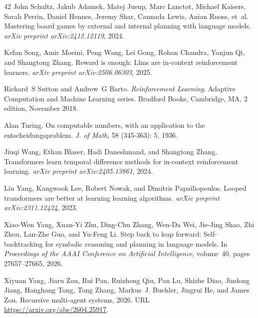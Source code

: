 \begin{thebibliography}{42}
John Schultz, Jakub Adamek, Matej Jusup, Marc Lanctot, Michael Kaisers, Sarah Perrin, Daniel Hennes, Jeremy Shar, Cannada Lewis, Anian Ruoss, et~al.
\newblock Mastering board games by external and internal planning with language models.
\newblock \emph{arXiv preprint arXiv:2412.12119}, 2024.

Kefan Song, Amir Moeini, Peng Wang, Lei Gong, Rohan Chandra, Yanjun Qi, and Shangtong Zhang.
\newblock Reward is enough: Llms are in-context reinforcement learners.
\newblock \emph{arXiv preprint arXiv:2506.06303}, 2025.

Richard~S Sutton and Andrew~G Barto.
\newblock \emph{Reinforcement Learning}.
\newblock Adaptive Computation and Machine Learning series. Bradford Books, Cambridge, MA, 2 edition, November 2018.

Alan Turing.
\newblock On computable numbers, with an application to the entscheidungsproblem.
\newblock \emph{J. of Math}, 58 (345-363): 5, 1936.

Jiuqi Wang, Ethan Blaser, Hadi Daneshmand, and Shangtong Zhang.
\newblock Transformers learn temporal difference methods for in-context reinforcement learning.
\newblock \emph{arXiv preprint arXiv:2405.13861}, 2024.

Liu Yang, Kangwook Lee, Robert Nowak, and Dimitris Papailiopoulos.
\newblock Looped transformers are better at learning learning algorithms.
\newblock \emph{arXiv preprint arXiv:2311.12424}, 2023.

Xiao-Wen Yang, Xuan-Yi Zhu, Ding-Chu Zhang, Wen-Da Wei, Jie-Jing Shao, Zhi Zhou, Lan-Zhe Guo, and Yu-Feng Li.
\newblock Step back to leap forward: Self-backtracking for symbolic reasoning and planning in language models.
\newblock In \emph{Proceedings of the AAAI Conference on Artificial Intelligence}, volume~40, pages 27657--27665, 2026{}.

Xiyuan Yang, Jiaru Zou, Rui Pan, Ruizhong Qiu, Pan Lu, Shizhe Diao, Jindong Jiang, Hanghang Tong, Tong Zhang, Markus~J. Buehler, Jingrui He, and James Zou.
\newblock Recursive multi-agent systems, 2026{}.
\newblock URL \url{https://arxiv.org/abs/2604.25917}.


\end{thebibliography}
